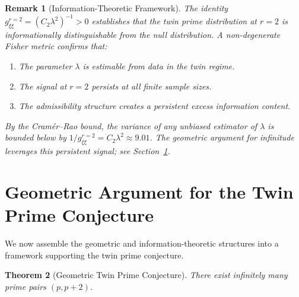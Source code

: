 \documentclass[12pt]{article}
\newtheorem{theorem}{Theorem}[section]
\newtheorem{remark}[theorem]{Remark}
\begin{document}
\begin{remark}[Information-Theoretic Framework]
The identity $g_{\xi\xi}^{r=2} = (C_2\lambda^2)^{-1} > 0$ establishes that the
twin prime distribution at $r=2$ is \textit{informationally distinguishable}
from the null distribution. A non-degenerate Fisher metric confirms that:
\begin{enumerate}
  \item The parameter $\lambda$ is estimable from data in the twin regime.
  \item The signal at $r=2$ persists at all finite sample sizes.
  \item The admissibility structure creates a persistent excess information content.
\end{enumerate}
By the Cram\'er--Rao bound, the variance of any unbiased estimator of $\lambda$
is bounded below by $1/g_{\xi\xi}^{r=2} = C_2\lambda^2 \approx 9.01$. The
geometric argument for infinitude leverages this persistent signal; see
Section~\ref{sec:geometric_argument}.
\end{remark}

\section{Geometric Argument for the Twin Prime Conjecture}
\label{sec:geometric_argument}

We now assemble the geometric and information-theoretic structures into a
framework supporting the twin prime conjecture.

\begin{theorem}[Geometric Twin Prime Conjecture]
There exist infinitely many prime pairs $(p, p+2)$.
\end{theorem}
\end{document}
